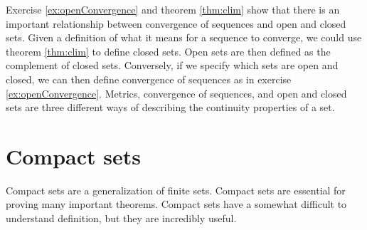 Exercise \ref{ex:openConvergence} and theorem \ref{thm:clim} show that
there is an important relationship between convergence of sequences
and open and closed sets. Given a definition of what it means for a
sequence to converge, we could use theorem \ref{thm:clim} to define
closed sets. Open sets are then defined as the complement of closed
sets. Conversely, if we specify which sets are open and closed, we can
then define convergence of sequences as in exercise
\ref{ex:openConvergence}. Metrics, convergence of sequences, and open and
closed sets are three different ways of describing the continuity
properties of a set. 

\section{Compact sets}

Compact sets are a generalization of finite sets. Compact sets are
essential for proving many important theorems. Compact sets have a
somewhat difficult to understand definition, but they are incredibly
useful.

